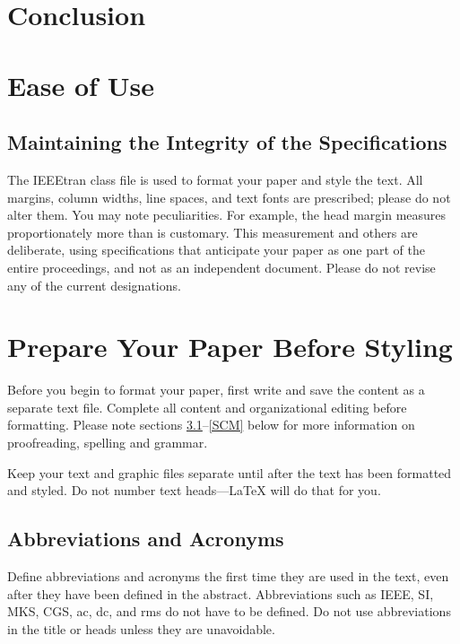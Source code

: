 \documentclass[conference, tikz]{IEEEtran}
\begin{document}
\section{Conclusion}


\newpage



\section{Ease of Use}

\subsection{Maintaining the Integrity of the Specifications}

The IEEEtran class file is used to format your paper and style the text. All margins, 
column widths, line spaces, and text fonts are prescribed; please do not 
alter them. You may note peculiarities. For example, the head margin
measures proportionately more than is customary. This measurement 
and others are deliberate, using specifications that anticipate your paper 
as one part of the entire proceedings, and not as an independent document. 
Please do not revise any of the current designations.

\section{Prepare Your Paper Before Styling}
Before you begin to format your paper, first write and save the content as a 
separate text file. Complete all content and organizational editing before 
formatting. Please note sections \ref{AA}--\ref{SCM} below for more information on 
proofreading, spelling and grammar.

Keep your text and graphic files separate until after the text has been 
formatted and styled. Do not number text heads---{\LaTeX} will do that 
for you.

\subsection{Abbreviations and Acronyms}\label{AA}
Define abbreviations and acronyms the first time they are used in the text, 
even after they have been defined in the abstract. Abbreviations such as 
IEEE, SI, MKS, CGS, ac, dc, and rms do not have to be defined. Do not use 
abbreviations in the title or heads unless they are unavoidable.
\end{document}
